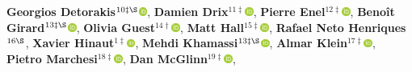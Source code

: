 \textbf{Georgios Detorakis}$^{10\ddagger\S}$\href{http://orcid.org/0000-0001-5891-1702}{\includegraphics[width=8pt]{orcid}},
\textbf{Damien Drix}$^{11\ddagger}$\href{http://orcid.org/0000-0003-4107-5693}{\includegraphics[width=8pt]{orcid}},
\textbf{Pierre Enel}$^{12\ddagger}$\href{http://orcid.org/0000-0001-8983-6223}{\includegraphics[width=8pt]{orcid}},
\textbf{Benoît Girard}$^{13\ddagger\S}$\href{http://orcid.org/0000-0002-8117-7064}{\includegraphics[width=8pt]{orcid}},
\textbf{Olivia Guest}$^{14\dagger}$\href{http://orcid.org/0000-0002-1891-0972}{\includegraphics[width=8pt]{orcid}},
\textbf{Matt Hall}$^{15\ddagger}$\href{http://orcid.org/0000-0002-9530-5477}{\includegraphics[width=8pt]{orcid}},
\textbf{Rafael Neto Henriques}$^{16\S}$,
\textbf{Xavier Hinaut}$^{1\ddagger}$\href{http://orcid.org/0000-0002-1924-1184}{\includegraphics[width=8pt]{orcid}},
\textbf{Mehdi Khamassi}$^{13\ddagger\S}$\href{http://orcid.org/0000-0002-2515-1046}{\includegraphics[width=8pt]{orcid}},
\textbf{Almar Klein}$^{17\ddagger}$\href{http://orcid.org/0000-0002-9978-2780}{\includegraphics[width=8pt]{orcid}},
\textbf{Pietro Marchesi}$^{18\ddagger}$\href{http://orcid.org/0000-0001-5955-6909}{\includegraphics[width=8pt]{orcid}},
\textbf{Dan McGlinn}$^{19\ddagger}$\href{http://orcid.org/0000-0003-2359-3526}{\includegraphics[width=8pt]{orcid}},
